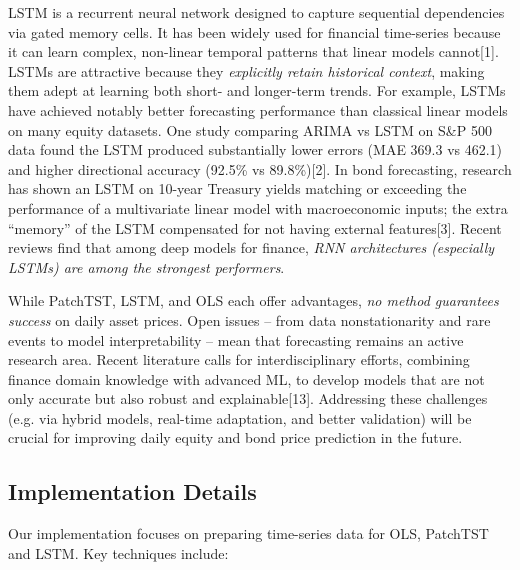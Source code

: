 \documentclass[conference]{IEEEtran}
\begin{document}
LSTM is a recurrent neural network designed to capture sequential dependencies via gated memory cells. It has been widely used for financial time-series because it can learn complex, non-linear temporal patterns that linear models cannot[1]. LSTMs are attractive because they \textit{explicitly retain historical context}, making them adept at learning both short- and longer-term trends. For example, LSTMs have achieved notably better forecasting performance than classical linear models on many equity datasets. One study comparing ARIMA vs LSTM on S\&P 500 data found the LSTM produced substantially lower errors (MAE 369.3 vs 462.1) and higher directional accuracy (92.5\% vs 89.8\%)[2]. In bond forecasting, research has shown an LSTM on 10-year Treasury yields matching or exceeding the performance of a multivariate linear model with macroeconomic inputs; the extra “memory” of the LSTM compensated for not having external features[3]. Recent reviews find that among deep models for finance, \textit{RNN architectures (especially LSTMs) are among the strongest performers}.

While PatchTST, LSTM, and OLS each offer advantages, \textit{no method guarantees success} on daily asset prices. Open issues – from data nonstationarity and rare events to model interpretability – mean that forecasting remains an active research area. Recent literature calls for interdisciplinary efforts, combining finance domain knowledge with advanced ML, to develop models that are not only accurate but also robust and explainable[13]. Addressing these challenges (e.g. via hybrid models, real-time adaptation, and better validation) will be crucial for improving daily equity and bond price prediction in the future.

\subsection{Implementation Details}

Our implementation focuses on preparing time-series data for OLS, PatchTST and LSTM. Key techniques include:
\end{document}
